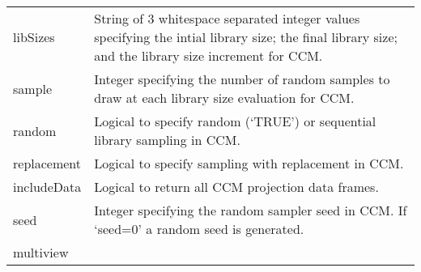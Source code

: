 \documentclass[]{article}
\begin{document}
\begin{longtable}[]{@{}ll@{}}
\begin{minipage}[t]{0.09\columnwidth}
libSizes\strut
\end{minipage} & \begin{minipage}[t]{0.85\columnwidth}\raggedright
String of 3 whitespace separated integer values specifying the intial
library size; the final library size; and the library size increment for
CCM.\strut
\end{minipage}\tabularnewline
\begin{minipage}[t]{0.09\columnwidth}\raggedright
sample\strut
\end{minipage} & \begin{minipage}[t]{0.85\columnwidth}\raggedright
Integer specifying the number of random samples to draw at each library
size evaluation for CCM.\strut
\end{minipage}\tabularnewline
\begin{minipage}[t]{0.09\columnwidth}\raggedright
random\strut
\end{minipage} & \begin{minipage}[t]{0.85\columnwidth}\raggedright
Logical to specify random (`TRUE') or sequential library sampling in
CCM.\strut
\end{minipage}\tabularnewline
\begin{minipage}[t]{0.09\columnwidth}\raggedright
replacement\strut
\end{minipage} & \begin{minipage}[t]{0.85\columnwidth}\raggedright
Logical to specify sampling with replacement in CCM.\strut
\end{minipage}\tabularnewline
\begin{minipage}[t]{0.09\columnwidth}\raggedright
includeData\strut
\end{minipage} & \begin{minipage}[t]{0.85\columnwidth}\raggedright
Logical to return all CCM projection data frames.\strut
\end{minipage}\tabularnewline
\begin{minipage}[t]{0.09\columnwidth}\raggedright
seed\strut
\end{minipage} & \begin{minipage}[t]{0.85\columnwidth}\raggedright
Integer specifying the random sampler seed in CCM. If `seed=0' a random
seed is generated.\strut
\end{minipage}\tabularnewline
\begin{minipage}[t]{0.09\columnwidth}\raggedright
multiview\strut
\end{minipage} & \begin{minipage}[t]{0.85\columnwidth}\raggedright

\end{minipage}
\end{longtable}
\end{document}
